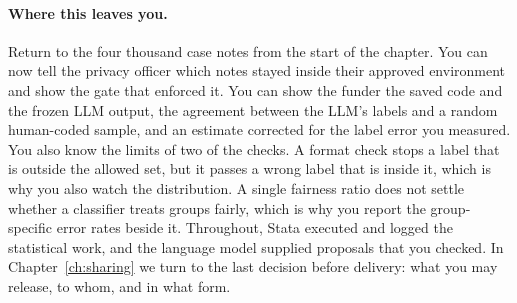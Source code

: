\paragraph{Where this leaves you.} Return to the four thousand case notes from the start of the chapter. You can now tell the privacy officer which notes stayed inside their approved environment and show the gate that enforced it. You can show the funder the saved code and the frozen LLM output, the agreement between the LLM's labels and a random human-coded sample, and an estimate corrected for the label error you measured. You also know the limits of two of the checks. A format check stops a label that is outside the allowed set, but it passes a wrong label that is inside it, which is why you also watch the distribution. A single fairness ratio does not settle whether a classifier treats groups fairly, which is why you report the group-specific error rates beside it. Throughout, Stata executed and logged the statistical work, and the language model supplied proposals that you checked. In Chapter~\ref{ch:sharing} we turn to the last decision before delivery: what you may release, to whom, and in what form.

